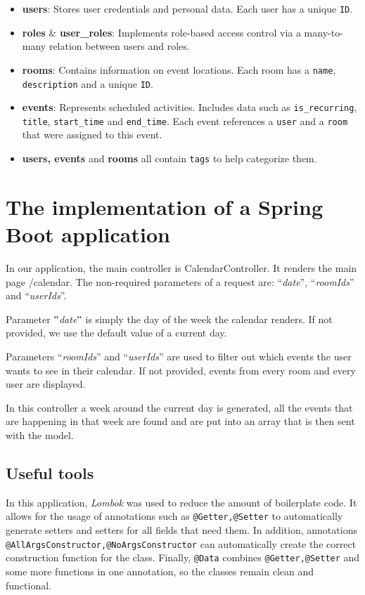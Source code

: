 \begin{itemize}
  \item \textbf{users}: Stores user credentials and personal data.
  Each user has a unique \texttt{ID}.

  \item \textbf{roles} \& \textbf{user\_roles}: Implements role-based access control via a many-to-many relation between users and roles.

  \item \textbf{rooms}: Contains information on event locations.
  Each room has a \texttt{name}, \texttt{description} and a unique \texttt{ID}.

  \item \textbf{events}: Represents scheduled activities.
  Includes data such as  \texttt{is\_recurring}, \texttt{title}, \texttt{start\_time} and \texttt{end\_time}.
  Each event references a \texttt{user} and a \texttt{room} that were assigned to this event.

  \item \textbf{users, events }and \textbf{rooms} all contain \texttt{tags} to help categorize them.
\end{itemize}


\newpage%

\section{The implementation of a Spring Boot application}\label{sec:the-implementation-of-a-spring-boot-application}
In our application, the main controller is CalendarController.
It renders the main page /calendar.
The non-required parameters of a request are: ``\textit{date}'', ``\textit{roomIds}'' and ``\textit{userIds}''.

Parameter \("\)\textit{date}\("\) is simply the day of the week the calendar renders.
If not provided, we use the default value of a current day.

Parameters ``\textit{roomIds}'' and ``\textit{userIds}'' are used to filter out which events the user wants to see in their calendar.
If not provided, events from every room and every user are displayed.

In this controller a week around the current day is generated, all the events that are happening in that week are found and are put into an array that is then sent with the model.


\subsection{Useful tools}\label{subsec:useful-tools}
In this application, \textit{Lombok} was used to reduce the amount of boilerplate code.
It allows for the usage of annotations such as \texttt{@Getter,@Setter} to automatically generate setters and setters for all fields that need them.
In addition, annotations \texttt{@AllArgsConstructor,@NoArgsConstructor} can automatically create the correct construction function for the class.
Finally, \texttt{@Data} combines \texttt{@Getter,@Setter} and some more functions in one annotation, so the classes remain clean and functional.

